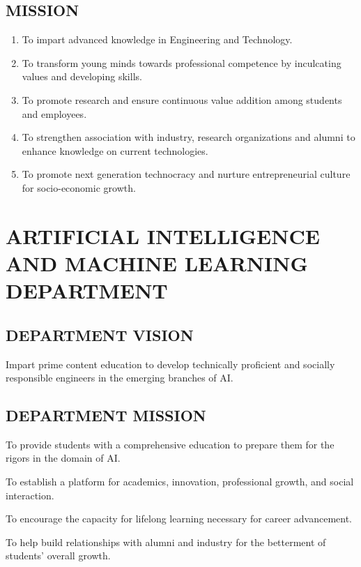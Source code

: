 \documentclass[12pt,a4paper]{article}
\begin{document}
\subsection*{MISSION}
\begin{enumerate}[leftmargin=1.6em,itemsep=0.5em]
\item To impart advanced knowledge in Engineering and Technology.
\item To transform young minds towards professional competence by inculcating values and developing skills.
\item To promote research and ensure continuous value addition among students and employees.
\item To strengthen association with industry, research organizations and alumni to enhance knowledge on current technologies.
\item To promote next generation technocracy and nurture entrepreneurial culture for socio-economic growth.
\end{enumerate}
\clearpage

\section*{ARTIFICIAL INTELLIGENCE AND MACHINE LEARNING DEPARTMENT}
\subsection*{DEPARTMENT VISION}
Impart prime content education to develop technically proficient and socially responsible engineers in the emerging branches of AI.
\subsection*{DEPARTMENT MISSION}
\begin{description}[leftmargin=0.9cm,style=nextline,itemsep=0.25em]
\item[M1] To provide students with a comprehensive education to prepare them for the rigors in the domain of AI.
\item[M2] To establish a platform for academics, innovation, professional growth, and social interaction.
\item[M3] To encourage the capacity for lifelong learning necessary for career advancement.
\item[M4] To help build relationships with alumni and industry for the betterment of students' overall growth.
\end{description}
\end{document}
